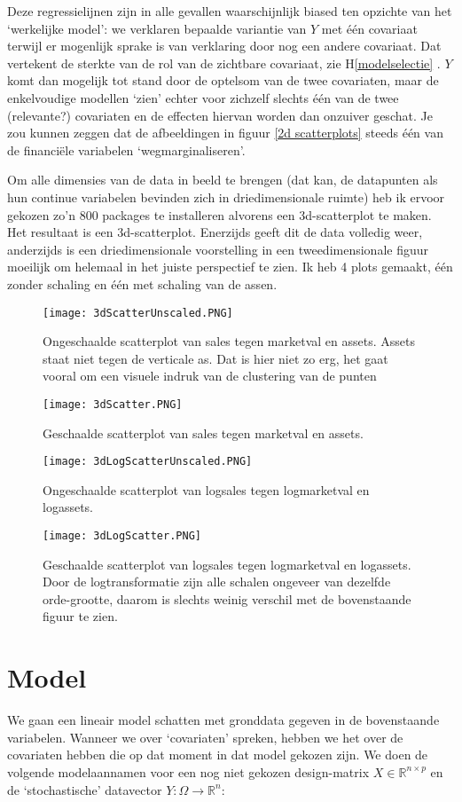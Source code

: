 \documentclass[a4paper]{report}
\begin{document}
  Deze regressielijnen zijn in alle gevallen waarschijnlijk biased ten opzichte van het `werkelijke model': we verklaren bepaalde variantie van $Y$ met \' e\' en covariaat terwijl er mogenlijk sprake is van verklaring door nog een andere covariaat. Dat vertekent de sterkte van de rol van de zichtbare covariaat, zie H\ref{modelselectie} . $Y$ komt dan mogelijk tot stand door de optelsom van de twee covariaten, maar de enkelvoudige modellen `zien' echter voor zichzelf slechts \' e\' en van de twee (relevante?) covariaten en de effecten hiervan worden dan onzuiver geschat. Je zou kunnen zeggen dat de afbeeldingen in figuur \ref{2d scatterplots} steeds \' e\' en van de financi\"ele variabelen `wegmarginaliseren'.
  
  Om alle dimensies van de data in beeld te brengen (dat kan, de datapunten als hun continue variabelen bevinden zich in driedimensionale ruimte) heb ik ervoor gekozen zo'n 800 packages te installeren alvorens een 3d-scatterplot te maken. Het resultaat is een 3d-scatterplot. Enerzijds geeft dit de data volledig weer, anderzijds is een driedimensionale voorstelling in een tweedimensionale figuur moeilijk om helemaal in het juiste perspectief te zien. Ik heb 4 plots gemaakt, \' e\' en zonder schaling en \' e\' en met schaling van de assen.
 
  \begin{figure}[H]
  \label{3d scatterplots}
  \texttt{[image: 3dScatterUnscaled.PNG]}
  \caption{Ongeschaalde scatterplot van sales tegen marketval en assets. Assets staat niet tegen de verticale as. Dat is hier niet zo erg, het gaat vooral om een visuele indruk van de clustering van de punten}
  \texttt{[image: 3dScatter.PNG]}
  \caption{Geschaalde scatterplot van sales tegen marketval en assets.}
  \end{figure}
  \begin{figure}[H]
  \texttt{[image: 3dLogScatterUnscaled.PNG]}
  \caption{Ongeschaalde scatterplot van logsales tegen logmarketval en logassets.}
  \texttt{[image: 3dLogScatter.PNG]}
  \caption{Geschaalde scatterplot van logsales tegen logmarketval en logassets. Door de logtransformatie zijn alle schalen ongeveer van dezelfde orde-grootte, daarom is slechts weinig verschil met de bovenstaande figuur te zien.}
  \end{figure}
  
\section{Model}  
\label{Model}
  We gaan een lineair model schatten met gronddata gegeven in de bovenstaande variabelen. Wanneer we over `covariaten' spreken, hebben we het over de covariaten hebben die op dat moment in dat model gekozen zijn. We doen de volgende modelaannamen voor een nog niet gekozen design-matrix $X \in \mathbb{R}^{n\times p}$ en de `stochastische' datavector $Y: \Omega \rightarrow \mathbb{R}^n$:
  
\end{document}
